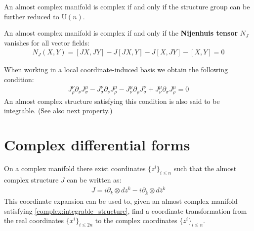 
	\begin{property}
		An almost complex manifold is complex if and only if the structure group can be further reduced to U$(n)$.
	\end{property}

	\begin{theorem}
		An almost complex manifold is complex if and only if the \textbf{Nijenhuis tensor} $N_J$ vanishes for all vector fields:
		\begin{gather}
			\label{complex:integrable_structure}
			N_J(X, Y) = [JX, JY] - J[JX, Y] - J[X, JY] - [X, Y] = 0
		\end{gather}
	\end{theorem}
	When working in a local coordinate-induced basis we obtain the following condition:
	\begin{gather}
		J_\rho^\nu\partial_\nu J_\sigma^\mu - J_\sigma^\nu\partial_\nu J_\rho^\mu - J_\nu^\mu\partial_\rho J_\sigma^\nu + J_\nu^\mu\partial_\sigma J_\rho^\mu = 0
	\end{gather}
	An almost complex structure satisfying this condition is also said to be integrable. (See also next property.)

\section{Complex differential forms}

	\begin{property}
		On a complex manifold there exist coordinates $\{z^i\}_{i\leq n}$ such that the almost complex structure $J$ can be written as:
		\begin{gather}
			\label{complex:complex_structure}
			J = i\partial_k\otimes dz^k - i\partial_{\overline{k}}\otimes d\overline{z}^k
		\end{gather}
		This coordinate expansion can be used to, given an almost complex manifold satisfying \ref{complex:integrable_structure}, find a coordinate transformation from the real coordinates $\{x^i\}_{i\leq2n}$ to the complex coordinates $\{z^i\}_{i\leq n}$.
	\end{property}

